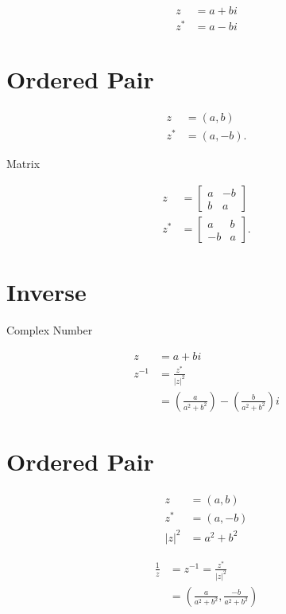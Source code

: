 \documentclass[10pt]{article}
\begin{document}
$$
\begin{aligned}
z & =a+b i \\
z^{*} & =a-b i
\end{aligned}
$$

\section{Ordered Pair}
$$
\begin{aligned}
z & =(a, b) \\
z^{*} & =(a,-b) .
\end{aligned}
$$

Matrix

$$
\begin{aligned}
z & =\left[\begin{array}{cc}
a & -b \\
b & a
\end{array}\right] \\
z^{*} & =\left[\begin{array}{cc}
a & b \\
-b & a
\end{array}\right] .
\end{aligned}
$$

\section{Inverse}
Complex Number

$$
\begin{aligned}
z & =a+b i \\
z^{-1} & =\frac{z^{*}}{|z|^{2}} \\
& =\left(\frac{a}{a^{2}+b^{2}}\right)-\left(\frac{b}{a^{2}+b^{2}}\right) i
\end{aligned}
$$

\section{Ordered Pair}
$$
\begin{aligned}
z & =(a, b) \\
z^{*} & =(a,-b) \\
|z|^{2} & =a^{2}+b^{2}
\end{aligned}
$$

$$
\begin{aligned}
\frac{1}{z} & =z^{-1}=\frac{z^{*}}{|z|^{2}} \\
& =\left(\frac{a}{a^{2}+b^{2}}, \frac{-b}{a^{2}+b^{2}}\right)
\end{aligned}
$$
\end{document}

